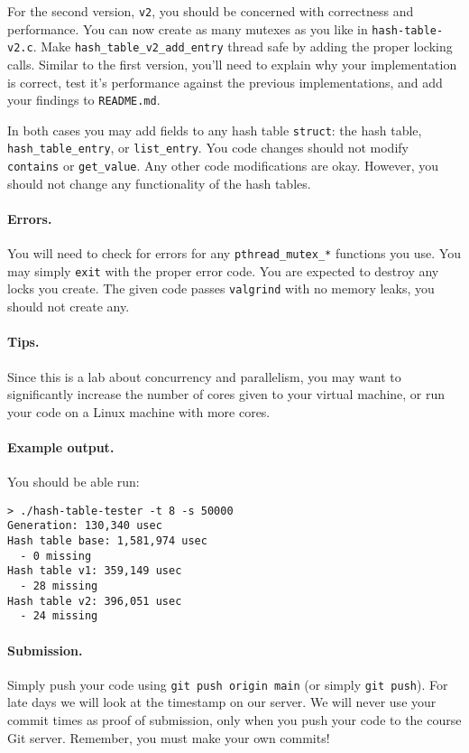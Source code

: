 For the second version, \texttt{v2}, you should be concerned with correctness
and performance.
You can now create as many mutexes as you like in \texttt{hash-table-v2.c}.
Make \texttt{hash\_table\_v2\_add\_entry} thread safe by adding the proper
locking calls.
Similar to the first version, you'll need to explain why your implementation
is correct, test it's performance against the previous implementations, and
add your findings to \texttt{README.md}.

In both cases you may add fields to any hash table \texttt{struct}: the hash
table, \texttt{hash\_table\_entry}, or \texttt{list\_entry}. You code changes
should not modify \texttt{contains} or \texttt{get\_value}. Any other code
modifications are okay. However, you should not change any functionality of the
hash tables.

\paragraph{Errors.}

You will need to check for errors for any \texttt{pthread\_mutex\_*} functions
you use.
You may simply \texttt{exit} with the proper error code.
You are expected to destroy any locks you create.
The given code passes \texttt{valgrind} with no memory leaks, you should not
create any.

\paragraph{Tips.}

Since this is a lab about concurrency and parallelism, you may want to
significantly increase the number of cores given to your virtual machine, or
run your code on a Linux machine with more cores.

\paragraph{Example output.}

You should be able run:

\begin{lstlisting}
> ./hash-table-tester -t 8 -s 50000
Generation: 130,340 usec
Hash table base: 1,581,974 usec
  - 0 missing
Hash table v1: 359,149 usec
  - 28 missing
Hash table v2: 396,051 usec
  - 24 missing
\end{lstlisting}

\paragraph{Submission.}

Simply push your code using \lstinline|git push origin main| (or simply
\lstinline|git push|).
For late days we will look at the timestamp on our server.
We will never use your commit times as proof of submission, only when you
push your code to the course Git server.
Remember, you must make your own commits!


